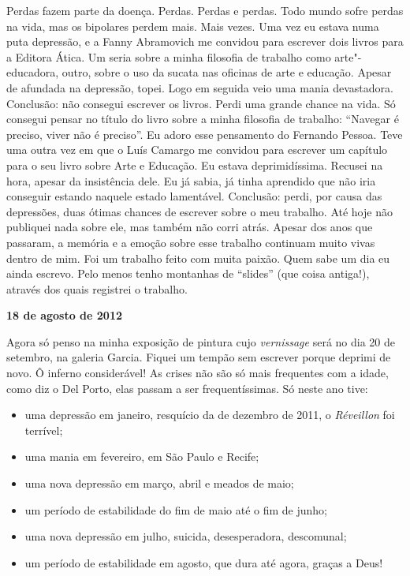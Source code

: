 Perdas fazem parte da doença. Perdas. Perdas e perdas. Todo mundo sofre
perdas na vida, mas os bipolares perdem mais. Mais vezes. Uma vez eu
estava numa puta depressão, e a Fanny Abramovich me convidou para
escrever dois livros para a Editora Ática. Um seria sobre a minha
filosofia de trabalho como arte"-educadora, outro, sobre o uso da sucata
nas oficinas de arte e educação. Apesar de afundada na depressão, topei.
Logo em seguida veio uma mania devastadora. Conclusão: não consegui
escrever os livros. Perdi uma grande chance na vida. Só consegui pensar
no título do livro sobre a minha filosofia de trabalho: ``Navegar é
preciso, viver não é preciso''. Eu adoro esse pensamento do Fernando
Pessoa. Teve uma outra vez em que o Luís Camargo me convidou para
escrever um capítulo para o seu livro sobre Arte e Educação. Eu estava
deprimidíssima. Recusei na hora, apesar da insistência dele. Eu já
sabia, já tinha aprendido que não iria conseguir estando naquele
estado lamentável. Conclusão: perdi, por causa das depressões, duas
ótimas chances de escrever sobre o meu trabalho. Até hoje não publiquei
nada sobre ele, mas também não corri atrás. Apesar dos anos que
passaram, a memória e a emoção sobre esse trabalho continuam muito vivas
dentro de mim. Foi um trabalho feito com muita paixão. Quem sabe um dia
eu ainda escrevo. Pelo menos tenho montanhas de ``slides'' (que coisa
antiga!), através dos quais registrei o trabalho.

\begin{center}\asterisc{}\end{center}

\begin{flushright}\textbf{18 de agosto de 2012}\end{flushright}


Agora só penso na minha exposição de pintura cujo \emph{vernissage} será
no dia 20 de setembro, na galeria Garcia. Fiquei um tempão sem escrever
porque deprimi de novo. Ô inferno considerável! As crises não são só
mais frequentes com a idade, como diz o Del Porto, elas passam a ser
frequentíssimas. Só neste ano tive:

\begin{itemize}
\item
  uma depressão em janeiro, resquício da de dezembro de 2011, o
  \emph{Réveillon} foi terrível;
\item
  uma mania em fevereiro, em São Paulo e Recife;
\item
  uma nova depressão em março, abril e meados de maio;
\item
  um período de estabilidade do fim de maio até o fim de junho;
\item
  uma nova depressão em julho, suicida, desesperadora, descomunal;
\item
  um período de estabilidade em agosto, que dura até agora, graças a
  Deus!
\end{itemize}

